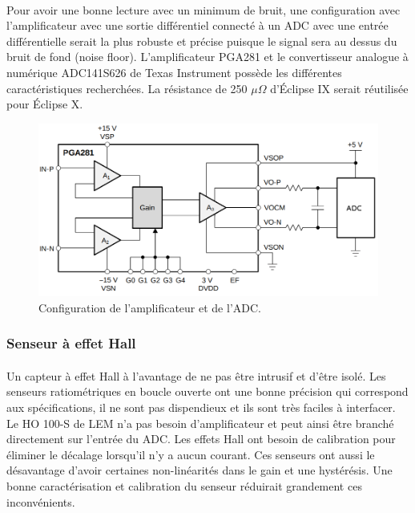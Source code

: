 	\paragraph*{}
	Pour avoir une bonne lecture avec un minimum de bruit, une configuration avec l'amplificateur avec une sortie différentiel connecté à un ADC avec une entrée différentielle serait la plus robuste et précise puisque le signal sera au dessus du bruit de fond (noise floor). L'amplificateur PGA281 et le convertisseur analogue à numérique ADC141S626 de Texas Instrument possède les différentes caractéristiques recherchées. La résistance de 250 $\mu \Omega$ d'Éclipse IX serait réutilisée pour Éclipse X.
	
	\begin{figure}[H]
		\centering
		\includegraphics[scale = 0.4]{Images/current_sense_shunt.png}
		\caption{Configuration de l'amplificateur et de l'ADC.}
		\label{fig:current_sense_shunt}
	\end{figure}
	
	\subsubsection*{Senseur à effet Hall}
	\paragraph*{}	
	Un capteur à effet Hall à l'avantage de ne pas être intrusif et d'être isolé. Les senseurs ratiométriques en boucle ouverte ont une bonne précision qui correspond aux spécifications, il ne sont pas dispendieux et ils sont très faciles à interfacer. Le HO 100-S de LEM n'a pas besoin d'amplificateur et peut ainsi être branché directement sur l'entrée du ADC. Les effets Hall ont besoin de calibration pour éliminer le décalage lorsqu'il n'y a aucun courant. Ces senseurs ont aussi le désavantage d'avoir certaines non-linéarités dans le gain et une hystérésis. Une bonne caractérisation et calibration du senseur réduirait grandement ces inconvénients.
	
